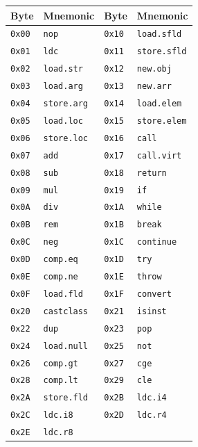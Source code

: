 \documentclass[11pt,a4paper]{article}
\begin{document}
\begin{longtable}{llll}
  \toprule
  \textbf{Byte} & \textbf{Mnemonic} & \textbf{Byte} & \textbf{Mnemonic} \\
  \midrule
  \endhead
  \texttt{0x00} & \texttt{nop}       & \texttt{0x10} & \texttt{load.sfld}   \\
  \texttt{0x01} & \texttt{ldc}       & \texttt{0x11} & \texttt{store.sfld}   \\
  \texttt{0x02} & \texttt{load.str}     & \texttt{0x12} & \texttt{new.obj}   \\
  \texttt{0x03} & \texttt{load.arg}     & \texttt{0x13} & \texttt{new.arr}   \\
  \texttt{0x04} & \texttt{store.arg}     & \texttt{0x14} & \texttt{load.elem}   \\
  \texttt{0x05} & \texttt{load.loc}     & \texttt{0x15} & \texttt{store.elem}   \\
  \texttt{0x06} & \texttt{store.loc}     & \texttt{0x16} & \texttt{call}     \\
  \texttt{0x07} & \texttt{add}       & \texttt{0x17} & \texttt{call.virt} \\
  \texttt{0x08} & \texttt{sub}       & \texttt{0x18} & \texttt{return}      \\
  \texttt{0x09} & \texttt{mul}       & \texttt{0x19} & \texttt{if}       \\
  \texttt{0x0A} & \texttt{div}       & \texttt{0x1A} & \texttt{while}    \\
  \texttt{0x0B} & \texttt{rem}       & \texttt{0x1B} & \texttt{break}    \\
  \texttt{0x0C} & \texttt{neg}       & \texttt{0x1C} & \texttt{continue} \\
  \texttt{0x0D} & \texttt{comp.eq}   & \texttt{0x1D} & \texttt{try}      \\
  \texttt{0x0E} & \texttt{comp.ne}   & \texttt{0x1E} & \texttt{throw}    \\
  \texttt{0x0F} & \texttt{load.fld}  & \texttt{0x1F} & \texttt{convert}     \\
  \texttt{0x20} & \texttt{castclass} & \texttt{0x21} & \texttt{isinst}   \\
  \texttt{0x22} & \texttt{dup}       & \texttt{0x23} & \texttt{pop}      \\
  \texttt{0x24} & \texttt{load.null}    & \texttt{0x25} & \texttt{not}      \\
  \texttt{0x26} & \texttt{comp.gt}       & \texttt{0x27} & \texttt{cge}      \\
  \texttt{0x28} & \texttt{comp.lt}       & \texttt{0x29} & \texttt{cle}      \\
  \texttt{0x2A} & \texttt{store.fld}     & \texttt{0x2B} & \texttt{ldc.i4}   \\
  \texttt{0x2C} & \texttt{ldc.i8}    & \texttt{0x2D} & \texttt{ldc.r4}   \\
  \texttt{0x2E} & \texttt{ldc.r8}    &               &                   \\
  \bottomrule
\end{longtable}
\end{document}
